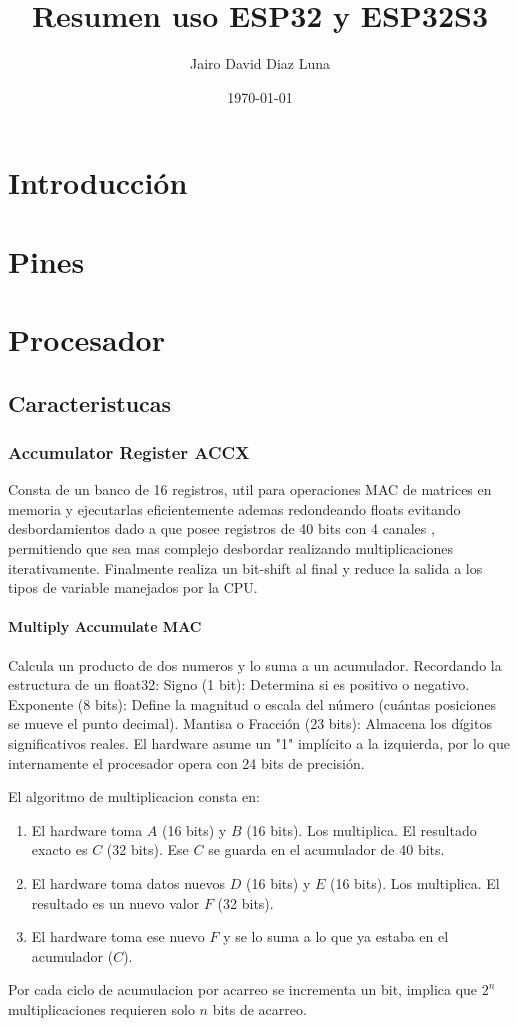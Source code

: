 \documentclass[12pt, a4paper]{article}
\title{\textbf{Resumen uso ESP32 y ESP32S3}}
\author{Jairo David Diaz Luna}
\date{\today}
\begin{document}
\maketitle
\thispagestyle{empty} 
\newpage

\tableofcontents
\newpage


\section{Introducción}

\section{Pines}

\section{Procesador}
\subsection{Caracteristucas}
\subsubsection{Accumulator Register ACCX}
Consta de un banco de 16 registros, util para operaciones MAC de matrices en memoria y ejecutarlas eficientemente ademas redondeando floats evitando desbordamientos 
dado a que posee registros de 40 bits con 4 canales , permitiendo que sea mas complejo desbordar realizando multiplicaciones iterativamente.
Finalmente realiza un bit-shift al final y reduce la salida a los tipos de variable manejados por la CPU.
\paragraph{Multiply Accumulate MAC}
Calcula un producto de dos numeros y lo suma a un acumulador.
Recordando la estructura de un float32: 
Signo (1 bit): Determina si es positivo o negativo.
Exponente (8 bits): Define la magnitud o escala del número (cuántas posiciones se mueve el punto decimal).
Mantisa o Fracción (23 bits): Almacena los dígitos significativos reales. El hardware asume un "1" implícito a la izquierda, por lo que internamente el procesador opera con 24 bits de precisión.

El algoritmo de multiplicacion consta en: 
\begin{enumerate}
    \item El hardware toma $A$ (16 bits) y $B$ (16 bits). Los multiplica. El resultado exacto es $C$ (32 bits). Ese $C$ se guarda en el acumulador de 40 bits.
    \item El hardware toma datos nuevos $D$ (16 bits) y $E$ (16 bits). Los multiplica. El resultado es un nuevo valor $F$ (32 bits).
    \item El hardware toma ese nuevo $F$ y se lo suma a lo que ya estaba en el acumulador ($C$).
\end{enumerate}
Por cada ciclo de acumulacion por acarreo se incrementa un bit, implica que $2^n$ multiplicaciones requieren solo $n$ bits de acarreo. 
\end{document}
